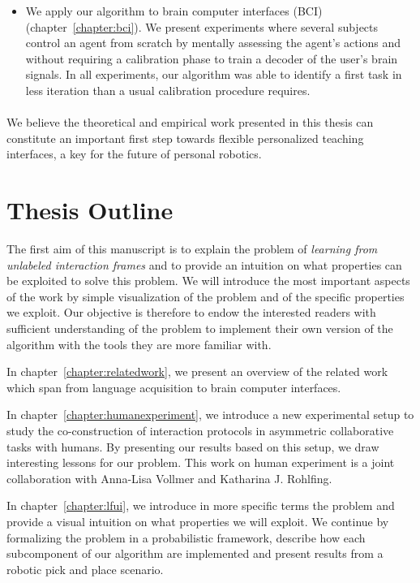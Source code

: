 \begin{itemize}
\item We apply our algorithm to brain computer interfaces (BCI) \cite{grizou2013zero,grizou2014calibration} (chapter~\ref{chapter:bci}). We present experiments where several subjects control an agent from scratch by mentally assessing the agent's actions and without requiring a calibration phase to train a decoder of the user's brain signals. In all experiments, our algorithm was able to identify a first task in less iteration than a usual calibration procedure requires.

\end{itemize}

\paragraph{} We believe the theoretical and empirical work presented in this thesis can constitute an important first step towards flexible personalized teaching interfaces, a key for the future of personal robotics.

\section{Thesis Outline}

The first aim of this manuscript is to explain the problem of \emph{learning from unlabeled interaction frames} and to provide an intuition on what properties can be exploited to solve this problem. We will introduce the most important aspects of the work by simple visualization of the problem and of the specific properties we exploit. Our objective is therefore to endow the interested readers with sufficient understanding of the problem to implement their own version of the algorithm with the tools they are more familiar with.

In chapter~\ref{chapter:relatedwork}, we present an overview of the related work which span from language acquisition to brain computer interfaces.

In chapter~\ref{chapter:humanexperiment}, we introduce a new experimental setup to study the co-construction of interaction protocols in asymmetric collaborative tasks with humans. By presenting our results based on this setup, we draw interesting lessons for our problem. This work on human experiment is a joint collaboration with Anna-Lisa Vollmer and Katharina J. Rohlfing.

In chapter~\ref{chapter:lfui}, we introduce in more specific terms the problem and provide a visual intuition on what properties we will exploit. We continue by formalizing the problem in a probabilistic framework, describe how each subcomponent of our algorithm are implemented and present results from a robotic pick and place scenario.

